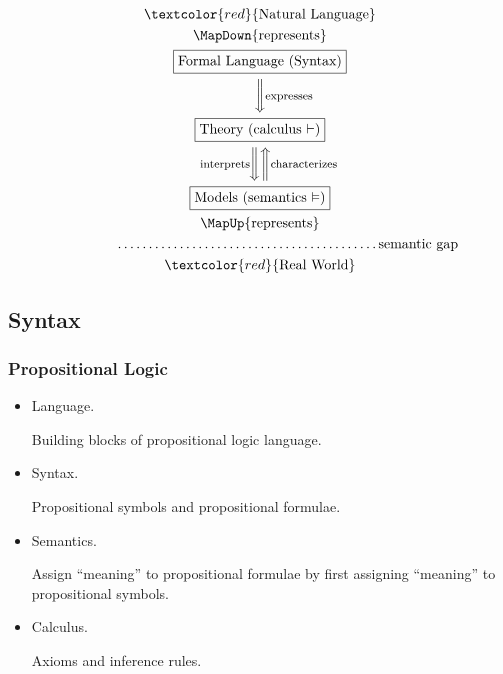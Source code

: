 \documentclass[UTF8,aspectratio=43,11pt,colorlinks,compress,openany]{beamer}%
\begin{document}
\begin{frame}\frametitle{}
\begin{gather*}
\textcolor{red}{{\text{Natural Language}}}\\
\MapDown{\text{represents}}\\
\fbox{Formal Language (Syntax)}\\
\bigg{\Downarrow}\rlap{\text{\footnotesize expresses}}\\
\fbox{Theory (calculus $\vdash$)}\\
\bigg{\Downarrow}\llap{\text{\footnotesize interprets\;\;\;}}\bigg{\Uparrow}\rlap{\text{\footnotesize characterizes}}\\
\fbox{Models (semantics $\vDash$)}\\
\MapUp{\text{represents}}\\
\qquad\qquad\dots\dots\dots\dots\dots\dots\dots\dots\dots\dots\dots\dots\dots\dots \text{semantic gap}\\
\textcolor{red}{{\text{Real World}}}
\end{gather*}
\end{frame}

\subsection{Syntax}

\begin{frame}\frametitle{Propositional Logic}
	\begin{itemize}
		\item Language.
		
		Building blocks of propositional logic language.
		\item Syntax.
		
		Propositional symbols and propositional formulae.
		\item Semantics.
		
		Assign ``meaning'' to propositional formulae by first assigning ``meaning'' to propositional symbols.
		\item Calculus.
		
		Axioms and inference rules.
	\end{itemize}
\end{frame}
\end{document}
